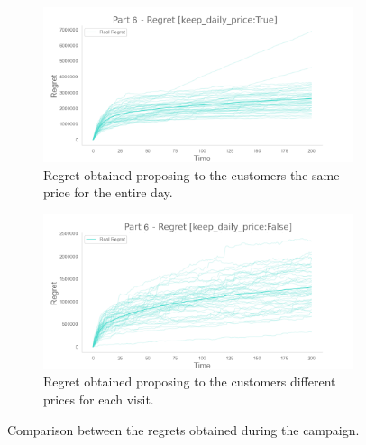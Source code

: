 \begin{figure}[!htb]
	\centering

	\begin{subfigure}[!H]{0.8\textwidth}
		\centering
		\includegraphics[width=\textwidth]{images/part6_enable-pricingTrue_keep-daily-priceTrue.png}
		\caption{Regret obtained proposing to the customers the same price for the entire day.}
	\end{subfigure}

	\begin{subfigure}[!H]{0.8\textwidth}
		\centering
		\includegraphics[width=\textwidth]{images/part6_enable-pricingTrue_keep-daily-priceFalse.png}
		\caption{Regret obtained proposing to the customers different prices for each visit.}
    \end{subfigure}
    \caption{Comparison between the regrets obtained during the campaign.}
	\label{fig:regret6Fig}
\end{figure}





